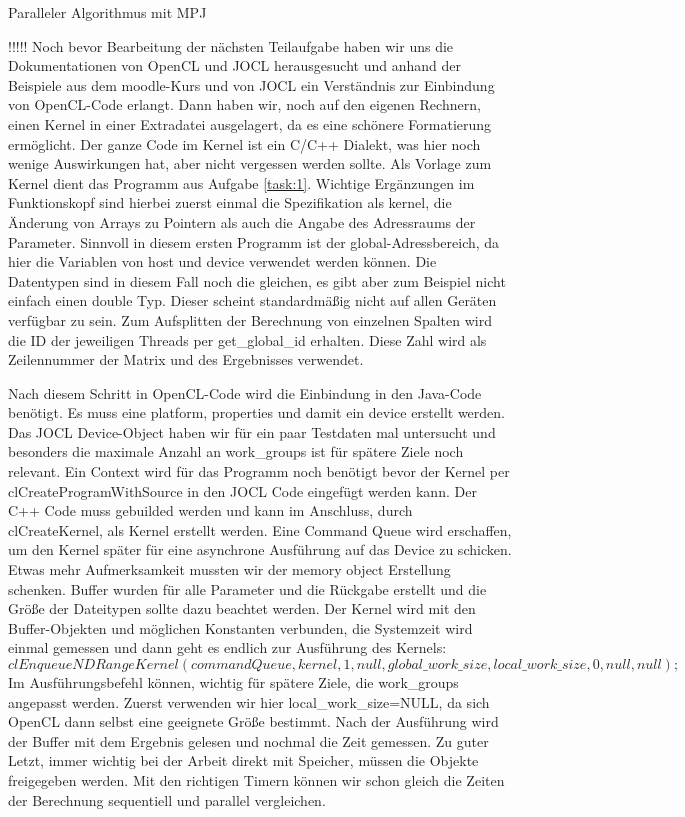 \documentclass[
ngerman,
subtask=ruled %
]{tudaexercise}
\begin{document}
	
	\begin{task}{Paralleler Algorithmus mit MPJ}
		
		!!!!!
		Noch bevor Bearbeitung der nächsten Teilaufgabe haben wir uns die Dokumentationen von OpenCL und JOCL herausgesucht und anhand der Beispiele aus dem moodle-Kurs und von JOCL ein Verständnis zur Einbindung von OpenCL-Code erlangt.
		Dann haben wir, noch auf den eigenen Rechnern, einen Kernel in einer Extradatei ausgelagert, da es eine schönere Formatierung ermöglicht.
		Der ganze Code im Kernel ist ein C/C++ Dialekt, was hier noch wenige Auswirkungen hat, aber nicht vergessen werden sollte.
		Als Vorlage zum Kernel dient das Programm aus Aufgabe \ref{task:1}. Wichtige Ergänzungen im Funktionskopf sind hierbei zuerst einmal die Spezifikation als kernel, die Änderung von Arrays zu Pointern als auch die Angabe des Adressraums der Parameter.
		Sinnvoll in diesem ersten Programm ist der global-Adressbereich, da hier die Variablen von host und device verwendet werden können.
		Die Datentypen sind in diesem Fall noch die gleichen, es gibt aber zum Beispiel nicht einfach einen double Typ. Dieser scheint standardmäßig nicht auf allen Geräten verfügbar zu sein.
		Zum Aufsplitten der Berechnung von einzelnen Spalten wird die ID der jeweiligen Threads per get\_global\_id erhalten.
		Diese Zahl wird als Zeilennummer der Matrix und des Ergebnisses verwendet.
		
		Nach diesem Schritt in OpenCL-Code wird die Einbindung in den Java-Code benötigt.
		Es muss eine platform, properties und damit ein device erstellt werden. Das JOCL Device-Object haben wir für ein paar Testdaten mal untersucht und besonders die maximale Anzahl an work\_groups ist für spätere Ziele noch relevant.
		Ein Context wird für das Programm noch benötigt bevor der Kernel per clCreateProgramWithSource in den JOCL Code eingefügt werden kann.
		Der C++ Code muss gebuilded werden und kann im Anschluss, durch clCreateKernel, als Kernel erstellt werden.
		Eine Command Queue wird erschaffen, um den Kernel später für eine asynchrone Ausführung auf das Device zu schicken.
		Etwas mehr Aufmerksamkeit mussten wir der memory object Erstellung schenken. Buffer wurden für alle Parameter und die Rückgabe erstellt und die Größe der Dateitypen sollte dazu beachtet werden.
		Der Kernel wird mit den Buffer-Objekten und möglichen Konstanten verbunden, die Systemzeit wird einmal gemessen und dann geht es endlich zur Ausführung des Kernels:
		$clEnqueueNDRangeKernel(commandQueue, kernel, 1, null,
		global\_work\_size, local\_work\_size,
		0, null, null);$
		Im Ausführungsbefehl können, wichtig für spätere Ziele, die work\_groups angepasst werden. Zuerst verwenden wir hier local\_work\_size=NULL, da sich OpenCL dann selbst eine geeignete Größe bestimmt.
		Nach der Ausführung wird der Buffer mit dem Ergebnis gelesen und nochmal die Zeit gemessen.
		Zu guter Letzt, immer wichtig bei der Arbeit direkt mit Speicher, müssen die Objekte freigegeben werden.
		Mit den richtigen Timern können wir schon gleich die Zeiten der Berechnung sequentiell und parallel vergleichen.
		

\end{task}
\end{document}
